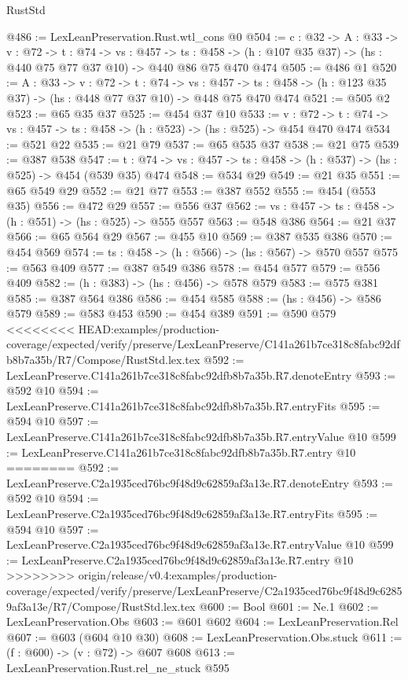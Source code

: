 \begin{lexlean}{RustStd}
\begin{coremodule}
{\begin{coremodule}
@486 := LexLeanPreservation.Rust.wtl_cons @0
@504 := {c : @32} ->
  {A : @33} ->
  {v : @72} ->
  {t : @74} ->
  {vs : @457} ->
  {ts : @458} -> (h : @107 @35 @37) -> (hs : @440 @75 @77 @37 @10) -> @440 @86 @75 @470 @474
@505 := @486 @1
@520 := {A : @33} ->
  {v : @72} ->
  {t : @74} ->
  {vs : @457} -> {ts : @458} -> (h : @123 @35 @37) -> (hs : @448 @77 @37 @10) -> @448 @75 @470 @474
@521 := @505 @2
@523 := @65 @35 @37
@525 := @454 @37 @10
@533 := {v : @72} ->
  {t : @74} -> {vs : @457} -> {ts : @458} -> (h : @523) -> (hs : @525) -> @454 @470 @474
@534 := @521 @22
@535 := @21 @79
@537 := @65 @535 @37
@538 := @21 @75
@539 := @387 @538
@547 := {t : @74} -> {vs : @457} -> {ts : @458} -> (h : @537) -> (hs : @525) -> @454 (@539 @35) @474
@548 := @534 @29
@549 := @21 @35
@551 := @65 @549 @29
@552 := @21 @77
@553 := @387 @552
@555 := @454 (@553 @35)
@556 := @472 @29
@557 := @556 @37
@562 := {vs : @457} -> {ts : @458} -> (h : @551) -> (hs : @525) -> @555 @557
@563 := @548 @386
@564 := @21 @37
@566 := @65 @564 @29
@567 := @455 @10
@569 := @387 @535 @386
@570 := @454 @569
@574 := {ts : @458} -> (h : @566) -> (hs : @567) -> @570 @557
@575 := @563 @409
@577 := @387 @549 @386
@578 := @454 @577
@579 := @556 @409
@582 := (h : @383) -> (hs : @456) -> @578 @579
@583 := @575 @381
@585 := @387 @564 @386
@586 := @454 @585
@588 := (hs : @456) -> @586 @579
@589 := @583 @453
@590 := @454 @389
@591 := @590 @579
<<<<<<<< HEAD:examples/production-coverage/expected/verify/preserve/LexLeanPreserve/C141a261b7ce318c8fabc92dfb8b7a35b/R7/Compose/RustStd.lex.tex
@592 := LexLeanPreserve.C141a261b7ce318c8fabc92dfb8b7a35b.R7.denoteEntry
@593 := @592 @10
@594 := LexLeanPreserve.C141a261b7ce318c8fabc92dfb8b7a35b.R7.entryFits
@595 := @594 @10
@597 := LexLeanPreserve.C141a261b7ce318c8fabc92dfb8b7a35b.R7.entryValue @10
@599 := LexLeanPreserve.C141a261b7ce318c8fabc92dfb8b7a35b.R7.entry @10
========
@592 := LexLeanPreserve.C2a1935ced76bc9f48d9c62859af3a13e.R7.denoteEntry
@593 := @592 @10
@594 := LexLeanPreserve.C2a1935ced76bc9f48d9c62859af3a13e.R7.entryFits
@595 := @594 @10
@597 := LexLeanPreserve.C2a1935ced76bc9f48d9c62859af3a13e.R7.entryValue @10
@599 := LexLeanPreserve.C2a1935ced76bc9f48d9c62859af3a13e.R7.entry @10
>>>>>>>> origin/release/v0.4:examples/production-coverage/expected/verify/preserve/LexLeanPreserve/C2a1935ced76bc9f48d9c62859af3a13e/R7/Compose/RustStd.lex.tex
@600 := Bool
@601 := Ne.{1}
@602 := LexLeanPreservation.Obs
@603 := @601 @602
@604 := LexLeanPreservation.Rel
@607 := @603 (@604 @10 @30)
@608 := LexLeanPreservation.Obs.stuck
@611 := (f : @600) -> (v : @72) -> @607 @608
@613 := LexLeanPreservation.Rust.rel_ne_stuck @595

\end{coremodule}}
\end{coremodule}
\end{lexlean}
